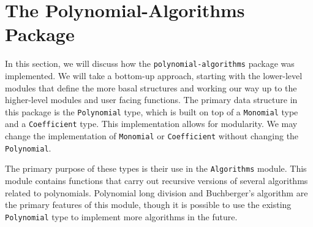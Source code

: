 \documentclass[MS, xcolor=dvipsnames]{wfuthesis}
\theoremstyle{definition}
\begin{document}
\chapter{The Polynomial-Algorithms Package}
In this section, we will discuss how the \lstinline{polynomial-algorithms} package was implemented. We will take a bottom-up approach, starting with the lower-level modules that define the more basal structures and working our way up to the higher-level modules and user facing functions. The primary data structure in this package is the \lstinline{Polynomial} type, which is built on top of a \lstinline{Monomial} type and a \lstinline{Coefficient} type. This implementation allows for modularity. We may change the implementation of \lstinline{Monomial} or \lstinline{Coefficient} without changing the \lstinline{Polynomial}. \par
The primary purpose of these types is their use in the \lstinline{Algorithms} module. This module contains functions that carry out recursive versions of several algorithms related to polynomials. Polynomial long division and Buchberger's algorithm are the primary features of this module, though it is possible to use the existing \lstinline{Polynomial} type to implement more algorithms in the future.

\end{document}
